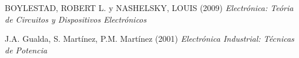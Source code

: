 \documentclass[osajnl,twocolumn,showpacs,superscriptaddress,10pt]{revtex4-1}
\begin{document}


\begin{thebibliography}{99}

\bibitem{} BOYLESTAD, ROBERT L. y NASHELSKY, LOUIS
(2009) \textit{Electrónica: Teória de Circuitos y Dispositivos
Electrónicos}

\bibitem{} J.A. Gualda, S. Martínez, P.M. Martínez (2001) \textit{Electrónica Industrial: Técnicas de Potencia}

\end{thebibliography}
\end{document}
